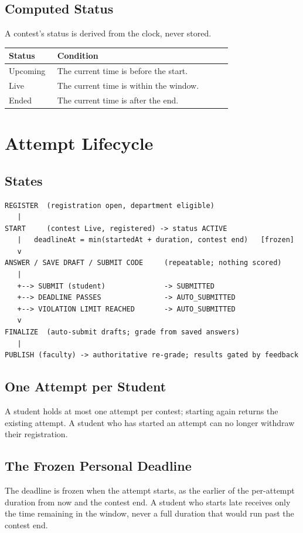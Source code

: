 \documentclass[12pt,a4paper,oneside]{report}
\begin{document}
\section{Computed Status}
A contest's status is derived from the clock, never stored.
\begin{longtable}{@{}p{0.20\linewidth} p{0.72\linewidth}@{}}
\toprule
\textbf{Status} & \textbf{Condition}\\
\midrule
\endhead
Upcoming & The current time is before the start.\\
Live & The current time is within the window.\\
Ended & The current time is after the end.\\
\bottomrule
\end{longtable}

\chapter{Attempt Lifecycle}
\section{States}
\begin{lstlisting}[language={}]
REGISTER  (registration open, department eligible)
   |
START     (contest Live, registered) -> status ACTIVE
   |   deadlineAt = min(startedAt + duration, contest end)   [frozen]
   v
ANSWER / SAVE DRAFT / SUBMIT CODE     (repeatable; nothing scored)
   |
   +--> SUBMIT (student)              -> SUBMITTED
   +--> DEADLINE PASSES               -> AUTO_SUBMITTED
   +--> VIOLATION LIMIT REACHED       -> AUTO_SUBMITTED
   v
FINALIZE  (auto-submit drafts; grade from saved answers)
   |
PUBLISH (faculty) -> authoritative re-grade; results gated by feedback
\end{lstlisting}

\section{One Attempt per Student}
A student holds at most one attempt per contest; starting again returns the
existing attempt. A student who has started an attempt can no longer withdraw
their registration.

\section{The Frozen Personal Deadline}
The deadline is frozen when the attempt starts, as the earlier of the
per-attempt duration from now and the contest end. A student who starts late
receives only the time remaining in the window, never a full duration that would
run past the contest end.
\end{document}
